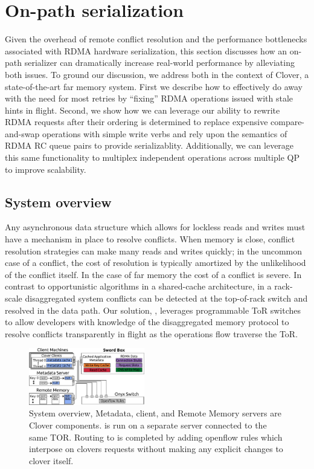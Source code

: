 \section{On-path serialization}

Given the overhead of remote conflict resolution and the performance bottlenecks
associated with RDMA hardware serialization, this section discusses how an
on-path serializer can dramatically increase real-world performance by
alleviating both issues.  To ground our discussion, we address both in the
context of Clover, a state-of-the-art far memory system. First we describe how
to effectively do away with the need for most retries by ``fixing'' RDMA
operations issued with stale hints in flight.  Second, we show how we can
leverage our ability to rewrite RDMA requests after their ordering is determined
to replace expensive compare-and-swap operations with simple write verbs and
rely upon the semantics of RDMA RC queue pairs to provide serializablity.
Additionally, we can leverage this same functionality to multiplex independent
operations across multiple QP to improve scalability.

\subsection{System overview}

Any asynchronous data structure which allows for lockless reads and
writes must have a mechanism in place to resolve conflicts. When
memory is close, conflict resolution strategies can make many reads
and writes quickly; in the uncommon case of a conflict, the cost of
resolution is typically amortized by the unlikelihood of the conflict
itself. In the case of far memory the cost of a conflict is severe. In
contrast to opportunistic algorithms in a shared-cache architecture,
in a rack-scale disaggregated system conflicts can be detected at the
top-of-rack switch and resolved in the data path. Our solution,
\sword, leverages programmable ToR switches to allow developers with
knowledge of the disaggregated memory protocol to resolve conflicts
transparently in flight as the operations flow traverse the ToR.

\begin{figure} \includegraphics[width=0.45\textwidth]{fig/overview_2.pdf}
\caption{ System overview, Metadata, client, and Remote Memory servers are
Clover components. \sword is run on a separate server connected to the same TOR.
Routing to \sword is completed by adding openflow rules which interpose on
clovers requests without making any explicit changes to clover itself.}
\label{fig:overview} \end{figure}

